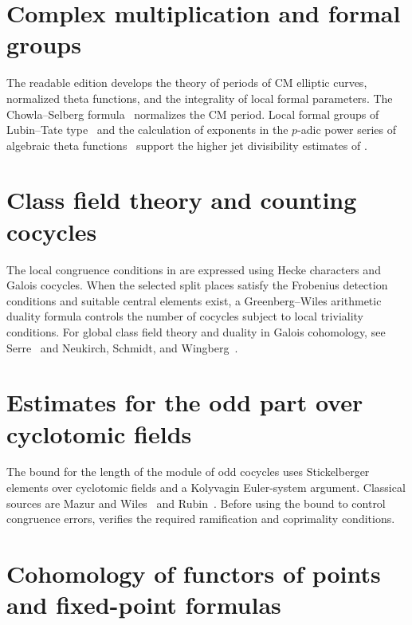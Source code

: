 \section{Complex multiplication and formal groups}

The readable edition develops the theory of periods of CM elliptic curves, normalized theta functions, and the integrality of local formal parameters. The Chowla--Selberg formula~\cite{SelbergChowla1967} normalizes the CM period. Local formal groups of Lubin--Tate type~\cite{LubinTate1965} and the calculation of exponents in the $p$-adic power series of algebraic theta functions~\cite{BannaiKobayashi2010} support the higher jet divisibility estimates of .

\section{Class field theory and counting cocycles}

The local congruence conditions in  are expressed using Hecke characters and Galois cocycles. When the selected split places satisfy the Frobenius detection conditions and suitable central elements exist, a Greenberg--Wiles arithmetic duality formula controls the number of cocycles subject to local triviality conditions. For global class field theory and duality in Galois cohomology, see Serre~\cite{Serre1997} and Neukirch, Schmidt, and Wingberg~\cite{NSW2008}.

\section{Estimates for the odd part over cyclotomic fields}

The bound for the length of the module of odd cocycles uses Stickelberger elements over cyclotomic fields and a Kolyvagin Euler-system argument. Classical sources are Mazur and Wiles~\cite{MazurWiles1984} and Rubin~\cite{Rubin2000}. Before using the bound to control congruence errors,  verifies the required ramification and coprimality conditions.

\section{Cohomology of functors of points and fixed-point formulas}

